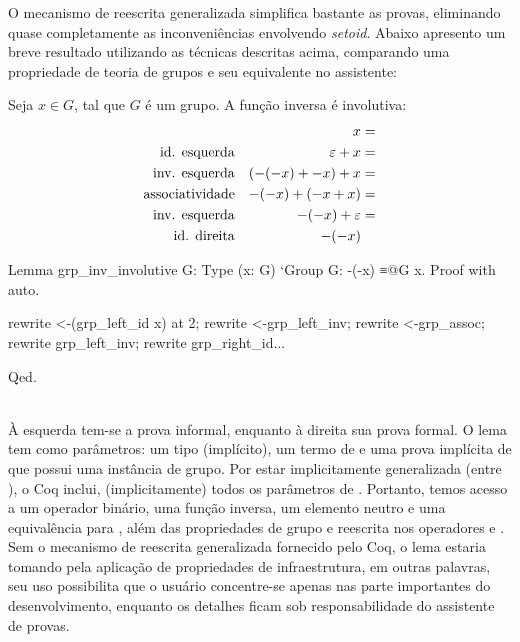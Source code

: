 O mecanismo de reescrita generalizada simplifica bastante as provas, eliminando quase completamente as inconveniências envolvendo \textit{setoid}. Abaixo apresento um breve resultado utilizando as técnicas descritas acima, comparando uma propriedade de teoria de grupos e seu equivalente no assistente:
\vspace*{.4em}\\
\begin{minipage}[t]{0.5\linewidth}
	\begin{lema}
		Seja $x \in G$, tal que $G$ é um grupo. A função inversa é involutiva:
		\begin{align*}
			& & x& =\\
			\text{\textup{id. esquerda}}& & \varepsilon + x& =\\
			\text{\textup{inv. esquerda}}& & (-(-x) + -x) + x& =\\
			\text{\textup{associatividade}}& & -(-x) + (-x + x)& =\\
			\text{\textup{inv. esquerda}}& & -(-x) + \varepsilon& =\\
			\text{\textup{id. direita}}& & -(-x) &
		\end{align*}
	\end{lema}
\end{minipage}
\hspace{.7 em}
\begin{minipage}[t]{0.5\linewidth}
	\begin{coqcode}
Lemma grp_inv_involutive {G: Type}
  (x: G) `{Group G}: -(-x) ≡@{G} x.
Proof with auto.

		
rewrite <-(grp_left_id x) at 2;
rewrite <-grp_left_inv;
rewrite <-grp_assoc;
rewrite grp_left_inv;
rewrite grp_right_id...
		
Qed.
	\end{coqcode}
\end{minipage}\vspace*{.6em}\\
À esquerda tem-se a prova informal, enquanto à direita sua prova formal. O lema  tem como parâmetros: um tipo  (implícito), um termo  de  e uma prova implícita de que  possui uma instância de grupo. Por estar implicitamente generalizada (entre ), o Coq inclui, (implicitamente) todos os parâmetros de . Portanto, temos acesso a um operador binário, uma função inversa, um elemento neutro e uma equivalência para , além das propriedades de grupo e reescrita nos operadores \coqinline{+} e \coqinline{-}. Sem o mecanismo de reescrita generalizada fornecido pelo Coq, o lema estaria tomando pela aplicação de propriedades de infraestrutura, em outras palavras, seu uso possibilita que o usuário concentre-se apenas nas parte importantes do desenvolvimento, enquanto os detalhes ficam sob responsabilidade do assistente de provas.
